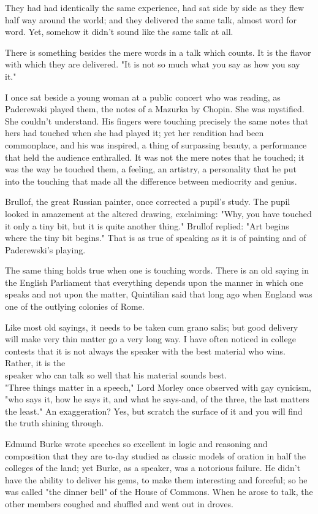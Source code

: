 \documentclass[10pt]{article}
\begin{document}
They had had identically the same experience, had sat side by side as they flew half way around the world; and they delivered the same talk, almost word for word. Yet, somehow it didn't sound like the same talk at all.

There is something besides the mere words in a talk which counts. It is the flavor with which they are delivered. "It is not so much what you say as how you say it."

I once sat beside a young woman at a public concert who was reading, as Paderewski played them, the notes of a Mazurka by Chopin. She was mystified. She couldn't understand. His fingers were touching precisely the same notes that hers had touched when she had played it; yet her rendition had been commonplace, and his was inspired, a thing of surpassing beauty, a performance that held the audience enthralled. It was not the mere notes that he touched; it was the way he touched them, a feeling, an artistry, a personality that he put into the touching that made all the difference between mediocrity and genius.

Brullof, the great Russian painter, once corrected a pupil's study. The pupil looked in amazement at the altered drawing, exclaiming: "Why, you have touched it only a tiny bit, but it is quite another thing." Brullof replied: "Art begins where the tiny bit begins." That is as true of speaking as it is of painting and of Paderewski's playing.

The same thing holds true when one is touching words. There is an old saying in the English Parliament that everything depends upon the manner in which one speaks and not upon the matter, Quintilian said that long ago when England was one of the outlying colonies of Rome.

Like most old sayings, it needs to be taken cum grano salis; but good delivery will make very thin matter go a very long way. I have often noticed in college contests that it is not always the speaker with the best material who wins. Rather, it is the\\
speaker who can talk so well that his material sounds best.\\
"Three things matter in a speech," Lord Morley once observed with gay cynicism, "who says it, how he says it, and what he says-and, of the three, the last matters the least." An exaggeration? Yes, but scratch the surface of it and you will find the truth shining through.

Edmund Burke wrote speeches so excellent in logic and reasoning and composition that they are to-day studied as classic models of oration in half the colleges of the land; yet Burke, as a speaker, was a notorious failure. He didn't have the ability to deliver his gems, to make them interesting and forceful; so he was called "the dinner bell" of the House of Commons. When he arose to talk, the other members coughed and shuffled and went out in droves.
\end{document}
